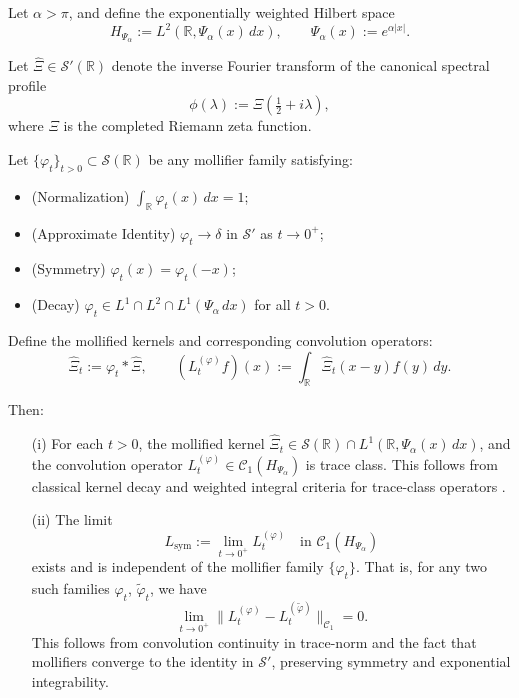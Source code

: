 \begin{lemma}
\label{lem:mollifier-independence-kernel-limit}
Let \( \alpha > \pi \), and define the exponentially weighted Hilbert space
\[
H_{\Psi_\alpha} := L^2(\mathbb{R}, \Psi_\alpha(x)\, dx), \qquad \Psi_\alpha(x) := e^{\alpha |x|}.
\]

Let \( \widehat{\Xi} \in \mathcal{S}'(\mathbb{R}) \) denote the inverse Fourier transform of the canonical spectral profile
\[
\phi(\lambda) := \Xi\left( \tfrac{1}{2} + i\lambda \right),
\]
where \( \Xi \) is the completed Riemann zeta function.

Let \( \{\varphi_t\}_{t > 0} \subset \mathcal{S}(\mathbb{R}) \) be any mollifier family satisfying:
\begin{itemize}
    \item \textnormal{(Normalization)} \( \int_{\mathbb{R}} \varphi_t(x)\, dx = 1 \);
    \item \textnormal{(Approximate Identity)} \( \varphi_t \to \delta \) in \( \mathcal{S}' \) as \( t \to 0^+ \);
    \item \textnormal{(Symmetry)} \( \varphi_t(x) = \varphi_t(-x) \);
    \item \textnormal{(Decay)} \( \varphi_t \in L^1 \cap L^2 \cap L^1(\Psi_\alpha\, dx) \) for all \( t > 0 \).
\end{itemize}

Define the mollified kernels and corresponding convolution operators:
\[
\widehat{\Xi}_t := \varphi_t * \widehat{\Xi}, \qquad
(L_t^{(\varphi)} f)(x) := \int_{\mathbb{R}} \widehat{\Xi}_t(x - y) f(y)\, dy.
\]

Then:
\begin{enumerate}
    \item[\textnormal{(i)}] For each \( t > 0 \), the mollified kernel \( \widehat{\Xi}_t \in \mathcal{S}(\mathbb{R}) \cap L^1(\mathbb{R}, \Psi_\alpha(x)\, dx) \), and the convolution operator \( L_t^{(\varphi)} \in \mathcal{C}_1(H_{\Psi_\alpha}) \) is trace class. This follows from classical kernel decay and weighted integral criteria for trace-class operators \cite[Ch.~4]{Simon2005TraceIdeals}.

    \item[\textnormal{(ii)}] The limit
    \[
    L_{\mathrm{sym}} := \lim_{t \to 0^+} L_t^{(\varphi)} \quad \text{in } \mathcal{C}_1(H_{\Psi_\alpha})
    \]
    exists and is independent of the mollifier family \( \{\varphi_t\} \). That is, for any two such families \( \varphi_t \), \( \tilde{\varphi}_t \), we have
    \[
    \lim_{t \to 0^+} \| L_t^{(\varphi)} - L_t^{(\tilde{\varphi})} \|_{\mathcal{C}_1} = 0.
    \]
    This follows from convolution continuity in trace-norm and the fact that mollifiers converge to the identity in \( \mathcal{S}' \), preserving symmetry and exponential integrability.
\end{enumerate}


\end{lemma}
